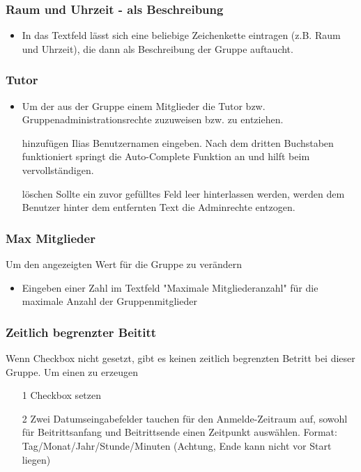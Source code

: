\subsubsection{Raum und Uhrzeit - als Beschreibung}
\begin{itemize}
	\item In das Textfeld lässt sich eine beliebige Zeichenkette eintragen (z.B. Raum und Uhrzeit), die dann als Beschreibung der Gruppe auftaucht. 
\end{itemize}

\subsubsection{Tutor}
\begin{itemize}
	\item Um der aus der Gruppe einem Mitglieder die Tutor bzw. Gruppenadministrationsrechte zuzuweisen bzw. zu entziehen. 
	\item[hinzufügen] Ilias Benutzernamen eingeben. Nach dem dritten Buchstaben funktioniert springt die Auto-Complete Funktion an und hilft beim vervollständigen. 
	\item[löschen] Sollte ein zuvor gefülltes Feld leer hinterlassen werden, werden dem Benutzer hinter dem entfernten Text die Adminrechte entzogen.
\end{itemize}

\subsubsection{Max Mitglieder}
Um den angezeigten Wert für die Gruppe zu verändern
\begin{itemize}
	\item Eingeben einer Zahl im Textfeld "Maximale Mitgliederanzahl" für die maximale Anzahl der Gruppenmitglieder 
\end{itemize}


\subsubsection{Zeitlich begrenzter Beititt}
Wenn Checkbox nicht gesetzt, gibt es keinen zeitlich begrenzten Betritt bei dieser Gruppe. Um einen zu erzeugen
\begin{itemize}
\item[1] Checkbox setzen 
\item[2] Zwei Datumseingabefelder tauchen für den Anmelde-Zeitraum auf, sowohl für Beitrittsanfang und Beitrittsende einen Zeitpunkt auswählen. Format: Tag/Monat/Jahr/Stunde/Minuten 
(Achtung, Ende kann nicht vor Start liegen)
\end{itemize}

